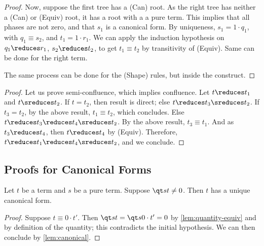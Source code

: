 \begin{proof}
  Now, suppose the first tree has a (Can) root. As the right tree has neither a
  (Can) or (Equiv) root, it has a root with a a pure term. This implies that
  all phases are not zero, and that $s_1$ is a canonical form. By uniqueness,
  $s_1 = 1 \cdot q_1$, with $q_1 \equiv s_2$, and $t_1 = 1 \cdot r_1$.
  We can apply the induction hypothesis on $q_1 \reduces r_1$,
  $s_2 \reduces t_2$, to get $t_1 \equiv t_2$ by transitivity of (Equiv).
  Same can be done for the right term.

  The same process can be done for the (Shape) rules, but inside the
  \textshape{} construct. \qedhere
\end{proof}

\confluence*

\begin{proof}
  Let us prove semi-confluence, which implies confluence.
  Let $t \reduces t_1$ and $t \sreduces t_2$.
  If $t = t_2$, then result is direct; else $t \reduces t_3 \sreduces t_2$.
  If $t_3 = t_2$, by the above result, $t_1 \equiv t_2$, which concludes.
  Else $t \reduces t_3 \reduces t_4 \sreduces t_2$.
  By the above result, $t_3 \equiv t_1$.
  And as $t_3 \reduces t_4$, then $t \reduces t_4$ by (Equiv).
  Therefore, $t \reduces t_1 \reduces t_4 \sreduces t_2$, and we
  conclude. \qedhere
\end{proof}

\subsection{Proofs for Canonical Forms}

\begin{lemma}\label{lem:quantity-nonzero}
  Let $t$ be a term and $s$ be a pure term.
  Suppose $\qt s t \neq 0$.
  Then $t$ has a unique canonical form.
\end{lemma}

\begin{proof}
  Suppose $t \equiv 0 \cdot t'$.
  Then $\qt s t = \qt s {0 \cdot t'} = 0$ by
  \autoref{lem:quantity-equiv} and by definition of
  the quantity; this contradicts the initial
  hypothesis. We can then conclude by \autoref{lem:canonical}. \qedhere
\end{proof}

\canonicaltyped*

